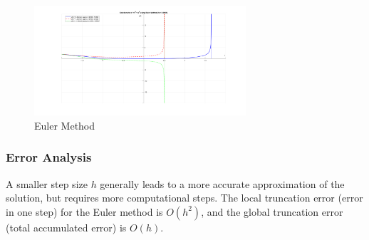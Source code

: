 \documentclass{article}
\begin{document}
\begin{figure}[htbp]
    \centering
    \includegraphics[width=0.7\textwidth]{pic/euler1.png}
    \caption{Euler Method}
    \label{fig: Euler Method}
\end{figure}

\subsubsection{Error Analysis}
A smaller step size $h$ generally leads to a more accurate approximation of the solution, but requires more computational steps. The local truncation error (error in one step) for the Euler method is $O(h^2)$, and the global truncation error (total accumulated error) is $O(h)$.
\end{document}
